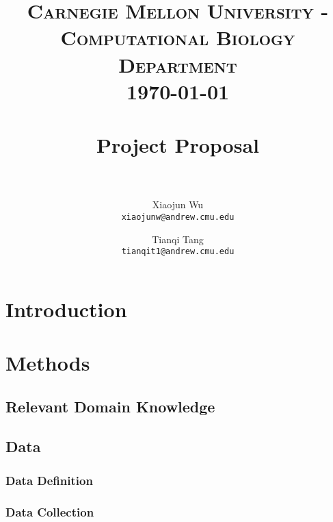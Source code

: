 \documentclass[paper=a4, fontsize=11pt]{scrartcl}
\title{
    \usefont{OT1}{bch}{b}{n}
    \normalfont \normalsize \textsc{Carnegie Mellon University - Computational Biology Department} \\ [25pt]
    \today \\
    \horrule{0.5pt} \\[0.4cm]
    \huge Project Proposal\\
    \horrule{2pt} \\[0.5cm]
}
\author{
  Xiaojun Wu\\
  \normalsize\texttt{xiaojunw@andrew.cmu.edu}
  \and
  Tianqi Tang\\
  \normalsize\texttt{tianqit1@andrew.cmu.edu}
  \date{}
}
\date{}
\numberwithin{equation}{section}    %
\numberwithin{figure}{section}      %
\numberwithin{table}{section}       %
\numberwithin{equation}{section}    %
\numberwithin{figure}{section}      %
\numberwithin{table}{section}       %
\begin{document}
\maketitle
\section{Introduction}



\section{Methods}



\subsection{Relevant Domain Knowledge}



\subsection{Data}


\subsubsection{Data Definition}


\subsubsection{Data Collection}




\begin{thebibliography}{1}


\end{thebibliography}
\end{document}
